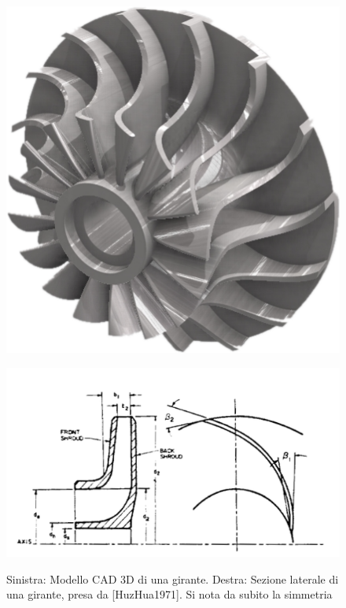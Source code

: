 \documentclass{tufte-handout}
\begin{document}
\begin{figure}
    \centering
    \begin{minipage}{.3\textwidth}
      \centering
      \includegraphics[width=.9\linewidth]{impeller3d.png}
      \label{fig:impeller3d}
    \end{minipage}%
    \begin{minipage}{.6\textwidth}
      \centering
      \includegraphics[width=.9\linewidth]{impeller2d.png}
      \label{fig:impeller2d}
    \end{minipage}
    \caption{
        Sinistra: Modello CAD 3D di una girante.
        Destra: Sezione laterale di una girante, presa da [HuzHua1971].
        Si nota da subito la simmetria
    }
\end{figure}
\end{document}
